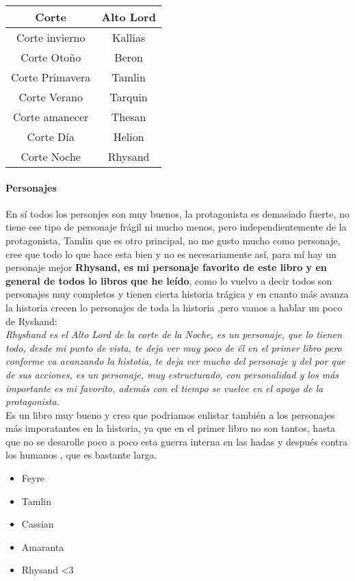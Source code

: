 \documentclass[12pt]{report}
\begin{document}
\begin{tabular}{| c | c |}
  \hline
  Corte & Alto Lord \\ \hline
  Corte invierno & Kallias\\ \hline
  Corte Otoño & Beron \\ \hline
  Corte Primavera & Tamlin \\ \hline
  Corte Verano & Tarquin \\ \hline
  Corte amanecer & Thesan \\ \hline
  Corte Día & Helion \\ \hline
  Corte Noche & Rhysand \\ \hline
\end{tabular}

\paragraph{Personajes}
En sí todos los personjes son muy buenos, la protagonista es demasiado fuerte, no tiene ese tipo de personaje frágil ni mucho menos,
pero independientemente de la protagonista, Tamlin que es otro principal, no me gusto mucho como personaje, cree que todo lo que
hace esta bien  y no es necesariamente así, para mí hay un personaje mejor \textbf{Rhysand, es mi personaje favorito
  de este libro y en general de todos lo libros que he leído},
como lo vuelvo a decir todos son personajes muy completos y tienen cierta historia trágica y
en cuanto más avanza la historia crecen lo personajes de toda la historia
,pero vamos a hablar un poco de Ryshand:\\[0.2cm]

\textit{Rhyshand es el Alto Lord de la corte de la Noche, es un personaje, que lo tienen todo, desde mi punto de vista, te deja ver
muy poco de él en el primer libro pero conforme va avanzando la histotia, te deja ver mucho del personaje y del por que de sus acciones,
es un personaje, muy estructurado, con personalidad y los más importante es mi favorito, además con el tiempo se vuelve en el apoyo de la protagonista.}\\[0.2cm]

Es un libro muy bueno y creo que podriamos enlistar también a los personajes más imporatantes en la historia, ya que en el primer libro no son tantos,
hasta que no se desarolle poco a poco esta guerra interna en las hadas y después contra los humanos , que es bastante larga.

\begin{itemize}
\item Feyre
\item Tamlin
\item Cassian
\item Amaranta
\item Rhysand <3
\end{itemize}
\end{document}
